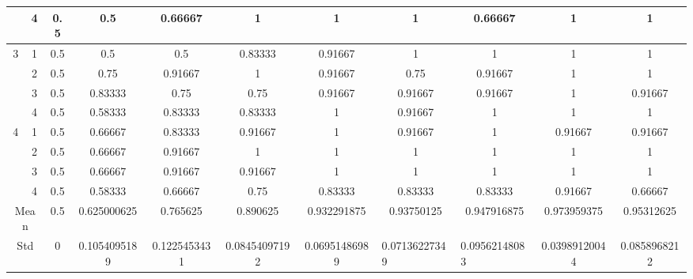 \documentclass[draft,dvipsnames]{drexel-thesis}
\begin{document}
\begin{thesis}
\begin{table}[!t]
{\begin{tabular}{|c|c|c|c|c|c|c|c|c|c|c|}
                      & 4                   & 0.5 & 0.5          & 0.66667      & 1             & 1             & 1                                  & 0.66667                            & 1             & 1            \\ \hline
\multirow{4}{*}{3}    & 1                   & 0.5 & 0.5          & 0.5          & 0.83333       & 0.91667       & 1                                  & 1                                  & 1             & 1            \\ \cline{2-11}
                      & 2                   & 0.5 & 0.75         & 0.91667      & 1             & 0.91667       & 0.75                               & 0.91667                            & 1             & 1            \\ \cline{2-11}
                      & 3                   & 0.5 & 0.83333      & 0.75         & 0.75          & 0.91667       & 0.91667                            & 0.91667                            & 1             & 0.91667      \\ \cline{2-11}
                      & 4                   & 0.5 & 0.58333      & 0.83333      & 0.83333       & 1             & 0.91667                            & 1                                  & 1             & 1            \\ \hline
\multirow{4}{*}{4}    & 1                   & 0.5 & 0.66667      & 0.83333      & 0.91667       & 1             & 0.91667                            & 1                                  & 0.91667       & 0.91667      \\ \cline{2-11}
                      & 2                   & 0.5 & 0.66667      & 0.91667      & 1             & 1             & 1                                  & 1                                  & 1             & 1            \\ \cline{2-11}
                      & 3                   & 0.5 & 0.66667      & 0.91667      & 0.91667       & 1             & 1                                  & 1                                  & 1             & 1            \\ \cline{2-11}
                      & 4                   & 0.5 & 0.58333      & 0.66667      & 0.75          & 0.83333       & 0.83333                            & 0.83333                            & 0.91667       & 0.66667      \\ \hline
\multicolumn{2}{|c|}{Mean}                  & 0.5 & 0.625000625  & 0.765625     & 0.890625      & 0.932291875   & 0.93750125                         & 0.947916875                        & 0.973959375   & 0.95312625   \\ \hline
\multicolumn{2}{|c|}{Std}                   & 0   & 0.1054095189 & 0.1225453431 & 0.08454097192 & 0.06951486989 & \multicolumn{1}{l|}{0.07136227349} & \multicolumn{1}{l|}{0.09562148083} & 0.03989120044 & 0.0858968212 \\ \hline
\end{tabular}}
\end{table}


\end{thesis}
\end{document}
